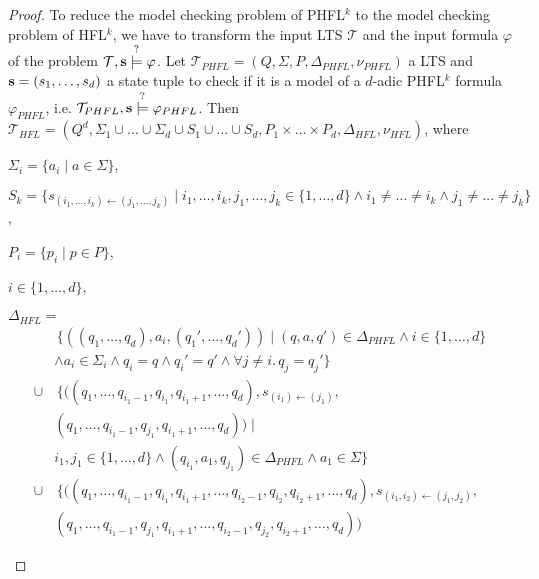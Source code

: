 \begin{proof}
    To reduce the model checking problem of PHFL$^k$ to the model checking problem of HFL$^k$, we have to transform
    the input LTS $\mathcal{T}$ and the input formula $\varphi$ of the problem $\mathcal{T}, \emph{s}
    \overset{?}{\models} \varphi$.
    Let $\mathcal{T}_{PHFL} = (Q, \Sigma, P, \Delta_{PHFL}, \nu_{PHFL})$ a LTS and $\emph{s} = (s_1, \dots, s_d)$ a
    state tuple to check if it is a model of a $d$-adic PHFL$^k$ formula $\varphi_{PHFL}$, i.e. $\mathcal{T}_{PHFL},
    \emph{s} \overset{?}{\models} \varphi_{PHFL}$. Then $\mathcal{T}_{HFL} = (Q^d, \Sigma_1 \cup
    \dots \cup \Sigma_d \cup S_1 \cup \dots \cup S_d, P_1 \times \dots \times P_d, \Delta_{HFL}, \nu_{HFL})$, where
    \begin{compactitem}
        \item $\Sigma_i = \{a_i \mid a \in \Sigma\}$,
        \item $S_k = \{s_{(i_1, \dots, i_k) \leftarrow (j_1, \dots, j_k)} \mid i_1, \dots, i_k, j_1, \dots, j_k \in
        \{1, \dots, d\} \wedge i_1 \neq \dots \neq i_k \wedge j_1 \neq \dots \neq j_k\}$,
        \item $P_i = \{p_i \mid p \in P\}$,
        \item $i \in \{1, \dots, d\}$,
        \item $\Delta_{HFL} =$
        \begin{align*}
                  &\,\{((q_1, \dots, q_d), a_i, ({q_1}', \dots, {q_d}')) \mid (q, a, q') \in \Delta_{PHFL}
                  \wedge i \in \{1, \dots, d\} \\&\wedge a_i \in \Sigma_i \wedge q_i = q \wedge {q_i}' = q' \wedge
                  \forall j \neq i.\, q_j = {q_j}'\}  \\
                  \cup & \,\{((q_1, \dots, q_{i_1 - 1}, q_{i_1}, q_{i_1 + 1}, \dots, q_d), s_{(i_1) \leftarrow (j_1)
                  }, \\&
                  (q_1, \dots, q_{i_1 - 1}, q_{j_1}, q_{i_1 + 1}, \dots, q_d)) \mid \\&
                  i_1, j_1 \in \{1, \dots, d\} \wedge (q_{i_1}, a_1, q_{j_1}) \in \Delta_{PHFL} \wedge a_1 \in
                  \Sigma\} \\
                  \cup & \,\{((q_1, \dots, q_{i_1 - 1}, q_{i_1}, q_{i_1 + 1}, \dots, q_{i_2 - 1}, q_{i_2}, q_{i_2 +
                  1}, \dots, q_d), s_{(i_1, i_2) \leftarrow (j_1, j_2)}, \\&
                  (q_1, \dots, q_{i_1 - 1}, q_{j_1}, q_{i_1 + 1}, \dots, q_{i_2 - 1}, q_{j_2}, q_{i_2 + 1}, \dots, q_d))

\end{align*}
\end{compactitem}
\end{proof}
